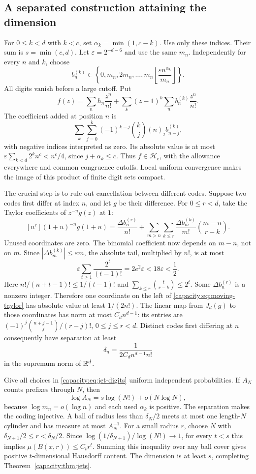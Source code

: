 \documentclass[11pt]{article}
\begin{document}
\subsection{A separated construction attaining the dimension}
For $0\le k<d$ with $k<c$, set $\alpha_k=\min(1,c-k)$. Use only these
indices. Their sum is $s=\min(c,d)$. Let $\varepsilon=2^{-d-6}$ and use
the same $m_n$. Independently for every $n$ and $k$, choose
\[
 b_n^{(k)}\in\left\{0,m_n,2m_n,\ldots,
 m_n\left\lfloor\frac{\varepsilon n^{\alpha_k}}{m_n}\right\rfloor\right\}.
 \tag{D}\label{capacity:eq:jet-digits}
\]
All digits vanish before a large cutoff. Put
\[
 f(z)=\sum_n h_n\frac{z^n}{n!}
       +\sum_k(z-1)^k\sum_n b_n^{(k)}\frac{z^n}{n!}.
 \tag{F}\label{capacity:eq:jet-code}
\]
The coefficient added at position $n$ is
\[
 \sum_k\sum_{j=0}^k(-1)^{k-j}\binom{k}{j}(n)_j b_{n-j}^{(k)},
\]
with negative indices interpreted as zero. Its absolute value is at most
$\varepsilon\sum_{k<d}2^k n^c<n^c/4$, since $j+\alpha_k\le c$.
Thus $f\in\mathcal H_c$, with the allowance everywhere and common
congruence cutoffs. Local uniform convergence makes the image of this
product of finite digit sets compact.

The crucial step is to rule out cancellation between different codes.
Suppose two codes first differ at index $n$, and let $g$ be their difference.
For $0\le r<d$, take the Taylor coefficients of $z^{-n}g(z)$ at $1$:
\[
 [u^r](1+u)^{-n}g(1+u)
 =\frac{\Delta b_n^{(r)}}{n!}
   +\sum_{m>n}\sum_{k\le r}
       \frac{\Delta b_m^{(k)}}{m!}\binom{m-n}{r-k}.
 \tag{T}\label{capacity:eq:moving-taylor}
\]
Unused coordinates are zero. The binomial coefficient now depends on
$m-n$, not on $m$. Since $|\Delta b_m^{(k)}|\le\varepsilon m$, the
absolute tail, multiplied by $n!$, is at most
\[
 \varepsilon\sum_{t\ge1}\frac{2^t}{(t-1)!}
 =2e^2\varepsilon<18\varepsilon<\frac12.
\]
Here $n!/(n+t-1)!\le1/(t-1)!$ and
$\sum_{k\le r}\binom{t}{r-k}\le2^t$. Some $\Delta b_n^{(r)}$ is a
nonzero integer. Therefore one coordinate on the left of
\eqref{capacity:eq:moving-taylor} has absolute value at least $1/(2n!)$.
The linear map from $J_d(g)$ to those coordinates has norm at most
$C_dn^{d-1}$: its entries are
$(-1)^j\binom{n+j-1}{j}/(r-j)!$, $0\le j\le r<d$.
Distinct codes first differing at $n$ consequently have separation at least
\[
 \delta_n=\frac{1}{2C_dn^{d-1}n!}
 \tag{S}\label{capacity:eq:jet-separation}
\]
in the supremum norm of $\mathbb{R}^d$.

Give all choices in \eqref{capacity:eq:jet-digits} uniform independent
probabilities. If $A_N$ counts prefixes through $N$, then
\[
 \log A_N=s\log(N!)+o(N\log N),
\]
because $\log m_n=o(\log n)$ and each used $\alpha_k$ is positive.
The separation makes the coding injective. A ball of radius less than
$\delta_N/2$ meets at most one length-$N$ cylinder and has measure at most
$A_N^{-1}$. For a small radius $r$, choose $N$ with
$\delta_{N+1}/2\le r<\delta_N/2$. Since
$\log(1/\delta_{N+1})/\log(N!)\to1$, for every $t<s$ this implies
$\mu(B(x,r))\le C_t r^t$. Summing this inequality over any ball cover
gives positive $t$-dimensional Hausdorff content. The dimension is at least
$s$, completing Theorem~\ref{capacity:thm:jets}.
\end{document}
